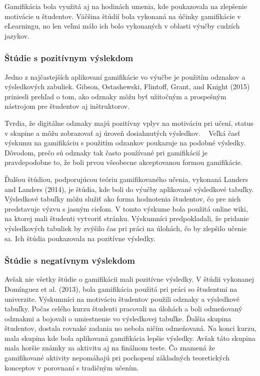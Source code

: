 \documentclass[10pt,oneside,slovak,a4paper]{article}
\begin{document}
Gamifikácia bola využitá aj na hodinách umenia, kde poukazovala na zlepšenie motivácie u študentov. Väčšina štúdií bola vykonaná na účinky gamifikácie v eLearningu, no len veľmi málo ich bolo vykonaných v oblasti výučby cudzích jazykov.

\subsubsection{Štúdie s pozitívnym výslekdom} \label{pozit}
Jedno z najčastejších aplikovaní gamifikácie vo výučbe je použitím odznakov a výsledkových zabuliek. Gibson, Ostashewski, Flintoff, Grant, and Knight (2015) priniesli prehľad o tom, ako odznaky môžu byť užitočným a prospešným nástrojom pre študentov aj inštruktorov. ~\cite{garland2015gamification}

Tvrdia, že digitálne odznaky majú pozitívny vplyv na motiváciu pri učení, status v skupine a môžu zobrazovať aj úroveň dosiahnutých výsledkov. ~\cite{gibson2015digital} Veľká časť výskumu na gamifikáciu s použitím odzankov poukazuje na podobné výsledky. Dôvodom, prečo sú odznaky tak často používané pri gamifikácií je pravdepodobne to, že boli prvou všeobecne akceptovanou formou gamifikácie. ~\cite{garland2015gamification}

Ďalšou štúdiou, podporujúcou teóriu gamifikovaného učenia, vykonaná Landers and Landers (2014), je štúdia, kde boli do výučby aplikované výsledkové tabuľky. Výsledkové tabuľky môžu služiť ako forma hodnotenia študentov, čo pre nich predstavuje výzvu s jasným cieľom. V tomto výskume bola použitá online wiki, na ktorej mali študenti vytvoriť stránku. Výskumníci predpokladali, že pridanie výsledkových tabuliek by zvýšilo čas pri práci na úlohách, čo by zlepšilo učenie sa. Ich štúdia poukazovala na pozitívne výsledky.
~\cite{garland2015gamification}

\subsubsection{Štúdie s negatívnym výslekdom} \label{negat}
Avšak nie všetky štúdie o gamifikácii mali pozitívne výsledky. V štúdii vykonanej Domínguez et al. (2013), bola gamifikácia použitá pri práci so študentmi na univerzite. Výskumníci na motiváciu študentov použili odznaky a výsledkové tabuľky. Počas celého kurzu študenti pracovali na úlohách a boli odmeňovaný odznakmi a bojovali o umiestnenie vo výsledkovej tabuľke. Ďalšia skupina študentov, dostala rovnaké zadania no nebola ničím odmeňovaná. Na konci kurzu, mala skupina kde bola aplikovaná gamifikácia lepšie výsledky. Avšak táto skupina mala horšie známky za aktivitu aj na finálnom teste. Čo znamená že gamifikované aktivity nepomáhajú pri pochopení základných teoretických konceptov v porovnaní s tradičným učením. ~\cite{dominguez2013gamifying}
\end{document}
